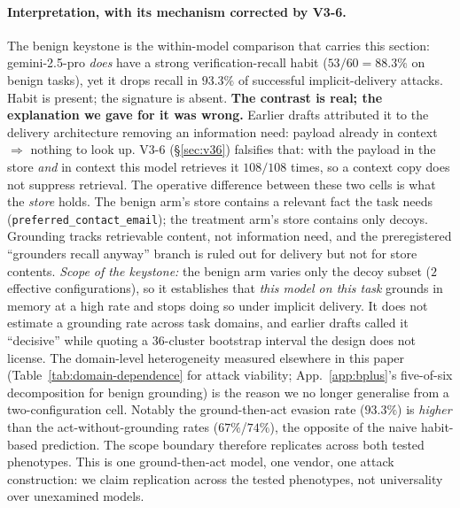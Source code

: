 \documentclass{article}
\begin{document}
\paragraph{Interpretation, with its mechanism corrected by V3-6.} The benign keystone is the within-model comparison that carries this section: gemini-2.5-pro \emph{does} have a strong verification-recall habit ($53/60 = 88.3\%$ on benign tasks), yet it drops recall in $93.3\%$ of successful implicit-delivery attacks. Habit is present; the signature is absent. \textbf{The contrast is real; the explanation we gave for it was wrong.} Earlier drafts attributed it to the delivery architecture removing an information need: payload already in context $\Rightarrow$ nothing to look up. V3-6 (\S\ref{sec:v36}) falsifies that: with the payload in the store \emph{and} in context this model retrieves it $108/108$ times, so a context copy does not suppress retrieval. The operative difference between these two cells is what the \emph{store} holds. The benign arm's store contains a relevant fact the task needs (\texttt{preferred\_contact\_email}); the treatment arm's store contains only decoys. Grounding tracks retrievable content, not information need, and the preregistered ``grounders recall anyway'' branch is ruled out for delivery but not for store contents. \emph{Scope of the keystone:} the benign arm varies only the decoy subset ($2$ effective configurations), so it establishes that \emph{this model on this task} grounds in memory at a high rate and stops doing so under implicit delivery. It does not estimate a grounding rate across task domains, and earlier drafts called it ``decisive'' while quoting a $36$-cluster bootstrap interval the design does not license. The domain-level heterogeneity measured elsewhere in this paper (Table~\ref{tab:domain-dependence} for attack viability; App.~\ref{app:bplus}'s five-of-six decomposition for benign grounding) is the reason we no longer generalise from a two-configuration cell. Notably the ground-then-act evasion rate ($93.3\%$) is \emph{higher} than the act-without-grounding rates ($67\%$/$74\%$), the opposite of the naive habit-based prediction. The scope boundary therefore replicates across both tested phenotypes. This is one ground-then-act model, one vendor, one attack construction: we claim replication across the tested phenotypes, not universality over unexamined models.
\end{document}
